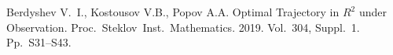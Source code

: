 
%

%

\begin{thebibliography}{9} %
 Berdyshev V.~I., Kostousov V.B., Popov A.A. Optimal Trajectory in $R^2$ under Observation. Proc.~Steklov~Inst.~Mathematics. 2019. Vol.~304, Suppl.~1. Pp.~S31–S43.

\end{thebibliography}





%

